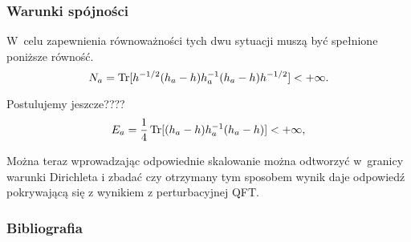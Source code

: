 \documentclass[10pt,t]{beamer}
\begin{document}
\begin{frame}
  \frametitle{Warunki spójności}


  W~celu zapewnienia równoważności tych dwu sytuacji muszą być spełnione
  poniższe równość.
  \begin{equation}
    \label{eq:3}
    N_{ a } =
    \operatorname{Tr}[ h^{ -1/2 } ( h_{ a } - h ) h_{ a }^ { -1 } ( h_{ a } - h ) h^{ -1/2 } ]
    < +\infty .
  \end{equation}

  Postulujemy jeszcze????
  \begin{equation}
    \label{eq:34}
    E_{ a } =
    \frac{ 1 }{ 4 } \operatorname{Tr}[ ( h_{ a } - h ) h_{ a }^ { -1 } ( h_{ a } - h ) ]
    < +\infty ,
  \end{equation}


  Można teraz wprowadzając odpowiednie skalowanie można odtworzyć w~granicy
  warunki Dirichleta i zbadać czy otrzymany tym sposobem wynik daje
  odpowiedź pokrywającą się z wynikiem z perturbacyjnej QFT.

\end{frame}










\appendix















\begin{frame}
  \frametitle{Bibliografia}


  

  {}

\end{frame}











\end{document}
